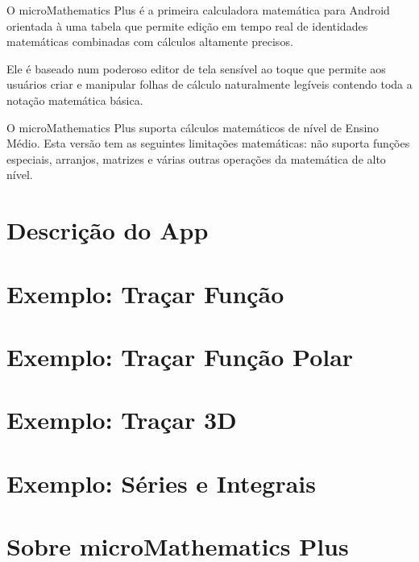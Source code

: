 \documentclass[DIV=calc, paper=a4, fontsize=11pt, twocolumn]{scrartcl}
\begin{document}
\maketitle
\thispagestyle{fancy} %

\begin{bf}
O microMathematics Plus é a primeira
calculadora matemática para Android
orientada à uma tabela que permite
edição em tempo real de identidades
matemáticas combinadas com cálculos
altamente precisos.

Ele é baseado num poderoso editor de
tela sensível ao toque que permite aos
usuários criar e manipular folhas de
cálculo naturalmente legíveis contendo
toda a notação matemática básica.

O microMathematics Plus suporta
cálculos matemáticos de nível de
Ensino Médio. Esta versão tem as
seguintes limitações matemáticas:  não
suporta funções especiais, arranjos,
matrizes e várias outras operações da
matemática de alto nível.
\end{bf}

\section{Descrição do App}


\section{Exemplo: Traçar Função}


\section{Exemplo: Traçar Função Polar}


\section{Exemplo: Traçar 3D}


\section{Exemplo: Séries e Integrais}


\section{Sobre microMathematics Plus}
\end{document}
